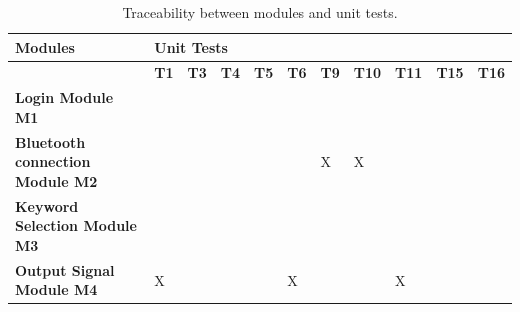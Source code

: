 \documentclass[12pt, titlepage]{article}
\begin{document}
\begin{table}[H]
  \centering
  \caption{Traceability between modules and unit tests.}
  \label{tab:my-table}
  \begin{tabular}{|p{2.5cm}|llllllllll|}
  \hline
  \textbf{Modules}                           & \multicolumn{10}{l|}{\textbf{Unit Tests}}                                                                                                                                                                                                                                                                                                  \\ \hline
                                              & \multicolumn{1}{l|}{\textbf{T1}} & \multicolumn{1}{l|}{\textbf{T3}} & \multicolumn{1}{l|}{\textbf{T4}} & \multicolumn{1}{l|}{\textbf{T5}} & \multicolumn{1}{l|}{\textbf{T6}} & \multicolumn{1}{l|}{\textbf{T9}} & \multicolumn{1}{l|}{\textbf{T10}} & \multicolumn{1}{l|}{\textbf{T11}} & \multicolumn{1}{l|}{\textbf{T15}} & \textbf{T16} \\ \hline
  \textbf{Login Module M1}                   & \multicolumn{1}{l|}{}            & \multicolumn{1}{l|}{}            & \multicolumn{1}{l|}{}            & \multicolumn{1}{l|}{}            & \multicolumn{1}{l|}{}            & \multicolumn{1}{l|}{}            & \multicolumn{1}{l|}{}             & \multicolumn{1}{l|}{}             & \multicolumn{1}{l|}{}             &              \\ \hline
  \textbf{Bluetooth connection Module M2}    & \multicolumn{1}{l|}{}            & \multicolumn{1}{l|}{}            & \multicolumn{1}{l|}{}            & \multicolumn{1}{l|}{}            & \multicolumn{1}{l|}{}            & \multicolumn{1}{l|}{X}           & \multicolumn{1}{l|}{X}            & \multicolumn{1}{l|}{}             & \multicolumn{1}{l|}{}             &              \\ \hline
  \textbf{Keyword Selection Module M3}       & \multicolumn{1}{l|}{}            & \multicolumn{1}{l|}{}            & \multicolumn{1}{l|}{}            & \multicolumn{1}{l|}{}            & \multicolumn{1}{l|}{}            & \multicolumn{1}{l|}{}            & \multicolumn{1}{l|}{}             & \multicolumn{1}{l|}{}             & \multicolumn{1}{l|}{}             &              \\ \hline
  \textbf{Output Signal Module M4}           & \multicolumn{1}{l|}{X}           & \multicolumn{1}{l|}{}            & \multicolumn{1}{l|}{}            & \multicolumn{1}{l|}{}            & \multicolumn{1}{l|}{X}           & \multicolumn{1}{l|}{}            & \multicolumn{1}{l|}{}             & \multicolumn{1}{l|}{X}            & \multicolumn{1}{l|}{}             &              \\ \hline

\end{tabular}
\end{table}
\end{document}
